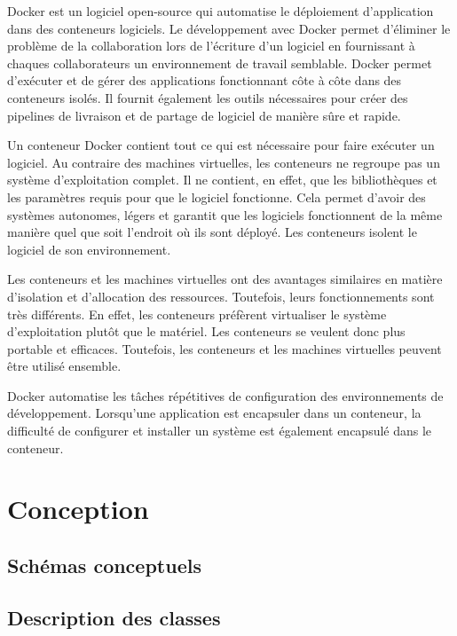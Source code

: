 \documentclass[a4paper,10pt,openany,oneside]{sphinxmanual}
\begin{document}
Docker est un logiciel open-source qui automatise le déploiement d'application dans des conteneurs logiciels.
Le développement avec Docker permet d'éliminer le problème de la collaboration lors de l'écriture d'un logiciel
en fournissant à chaques collaborateurs un environnement de travail semblable. Docker permet d'exécuter et de gérer
des applications fonctionnant côte à côte dans des conteneurs isolés. Il fournit également les outils nécessaires pour
créer des pipelines de livraison et de partage de logiciel de manière sûre et rapide.

Un conteneur Docker contient tout ce qui est nécessaire pour faire exécuter un logiciel. Au contraire des machines virtuelles,
les conteneurs ne regroupe pas un système d'exploitation complet. Il ne contient, en effet, que les bibliothèques et les paramètres
requis pour que le logiciel fonctionne. Cela permet d'avoir des systèmes autonomes, légers et garantit que les logiciels fonctionnent
de la même manière quel que soit l'endroit où ils sont déployé. Les conteneurs isolent le logiciel de son environnement.

Les conteneurs et les machines virtuelles ont des avantages similaires en matière d'isolation et d'allocation des ressources. Toutefois,
leurs fonctionnements sont très différents. En effet, les conteneurs préfèrent virtualiser le système d'exploitation plutôt que le matériel.
Les conteneurs se veulent donc plus portable et efficaces. Toutefois, les conteneurs et les machines virtuelles peuvent être utilisé ensemble.

Docker automatise les tâches répétitives de configuration des environnements de développement. Lorsqu'une application est encapsuler dans un
conteneur, la difficulté de configurer et installer un système est également encapsulé dans le conteneur.


\chapter{Conception}
\label{index:conception}

\section{Schémas conceptuels}
\label{index:schemas-conceptuels}

\section{Description des classes}
\label{index:description-des-classes}
\end{document}
